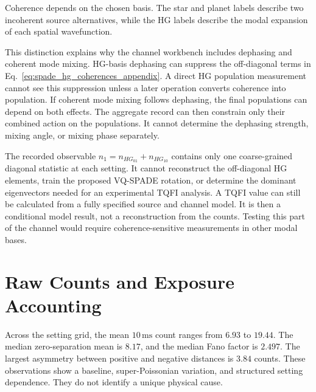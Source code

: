 \faLightbulb \hspace{5pt} Coherence depends on the chosen basis.  The star and planet labels describe two incoherent source alternatives, while the HG labels describe the modal expansion of each spatial wavefunction.

This distinction explains why the channel workbench includes dephasing and coherent mode mixing.  HG-basis dephasing can suppress the off-diagonal terms in Eq.~\eqref{eq:spade_hg_coherences_appendix}.  A direct HG population measurement cannot see this suppression unless a later operation converts coherence into population.  If coherent mode mixing follows dephasing, the final populations can depend on both effects.  The aggregate record can then constrain only their combined action on the populations.  It cannot determine the dephasing strength, mixing angle, or mixing phase separately.

The recorded observable $n_1=n_{HG_{01}}+n_{HG_{10}}$ contains only one coarse-grained diagonal statistic at each setting.  It cannot reconstruct the off-diagonal HG elements, train the proposed VQ-SPADE rotation, or determine the dominant eigenvectors needed for an experimental TQFI analysis.  A TQFI value can still be calculated from a fully specified source and channel model.  It is then a conditional model result, not a reconstruction from the counts.  Testing this part of the channel would require coherence-sensitive measurements in other modal bases.

\section{Raw Counts and Exposure Accounting}

Across the setting grid, the mean $10\,\mathrm{ms}$ count ranges from $6.93$ to $19.44$.  The median zero-separation mean is $8.17$, and the median Fano factor is $2.497$.  The largest asymmetry between positive and negative distances is $3.84$ counts.  These observations show a baseline, super-Poissonian variation, and structured setting dependence.  They do not identify a unique physical cause.

